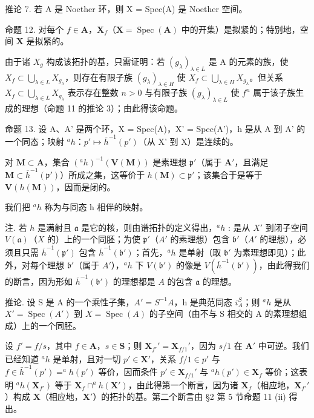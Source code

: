 推论 7. 若 A 是 Noether 环，则 X = Spec(A) 是 Noether 空间。

命题 12. 对每个 \(f \in \mathbf{A}\)，\(\mathbf{X}_f\)（\(\mathbf{X} = \operatorname{Spec}(\mathbf{A})\) 中的开集）是拟紧的；特别地，空间 \(\mathbf{X}\) 是拟紧的。

由于诸 \(X_{g}\) 构成该拓扑的基，只需证明：若 \((g_{\lambda})_{\lambda\in L}\) 是 A 的元素的族，使 \(X_{f}\subset\bigcup_{\lambda\in L}X_{g_{\lambda}}\)，则存在有限子族 \((g_{\lambda})_{\lambda\in H}\) 使 \(X_{f}\subset\bigcup_{\lambda\in H}X_{g_{\lambda}}\)。但关系 \(X_{f}\subset\bigcup_{\lambda\in L}X_{g_{\lambda}}\) 表示存在整数 \(n > 0\) 与有限子族 \((g_{\lambda})_{\lambda\in L}\) 使 \(f^{n}\) 属于该子族生成的理想（命题 11 的推论 3）；由此得该命题。

命题 13. 设 A、A' 是两个环，X = Spec(A)，X' = Spec(A')，h 是从 A 到 A' 的一个同态；映射 \(^a h\)：\(p' \mapsto \overline{h}^{-1}(p')\)（从 X' 到 X）是连续的。

对 \(\mathbf{M} \subset \mathbf{A}\)，集合 \((^a h)^{-1}(\mathbf{V}(\mathbf{M}))\) 是素理想 \(\mathfrak{p}'\)（属于 \(\mathbf{A}'\)，且满足 \(\mathbf{M} \subset \overline{h}^{-1}(\mathfrak{p}')\)）所成之集，这等价于 \(h(\mathbf{M}) \subset \mathfrak{p}'\)；该集合于是等于 \(\mathbf{V}(h(\mathbf{M}))\)，因而是闭的。

我们把 \(^{a}h\) 称为与同态 h 相伴的映射。

注. 若 \(h\) 是满射且 \(\mathfrak{a}\) 是它的核，则由谱拓扑的定义得出，\(^a h\) : 是从 \(X'\) 到闭子空间 \(V(\mathfrak{a})\)（\(X\) 的）上的一个同胚；为使 \(\mathfrak{p}'\)（\(A'\) 的素理想）包含 \(\mathfrak{b}'\)（\(A'\) 的理想），必须且只需 \(\overline{h}^{-1}(\mathfrak{p}')\) 包含 \(\overline{h}^{-1}(\mathfrak{b}')\)；首先，\(^a h\) 是单射（取 \(\mathfrak{b}'\) 为素理想即见）；此外，对每个理想 \(\mathfrak{b}'\)（属于 \(A'\)），\(^a h\) 下 \(V(\mathfrak{b}')\) 的像是 \(V(\overline{h}^{-1}(\mathfrak{b}'))\)，由此得我们的断言，因为形如 \(\overline{h}^{-1}(\mathfrak{b}')\) 的理想都是 \(A\) 的包含 \(\mathfrak{a}\) 的理想。

推论. 设 S 是 A 的一个乘性子集，\(A' = S^{-1}A\)，h 是典范同态 \(i_{A}^{S}\)；则 \(^{a}h\) 是从 \(X' = \operatorname{Spec}(A')\) 到 \(X = \operatorname{Spec}(A)\) 的子空间（由不与 S 相交的 A 的素理想组成）上的一个同胚。

设 \(f' = f / s\)，其中 \(f \in \mathbf{A}\)，\(s \in \mathbf{S}\)；则 \(\mathbf{X}_{f'}' = \mathbf{X}_{f/1}'\)，因为 \(s / 1\) 在 \(\mathbf{A}'\) 中可逆。我们已经知道 \(^a h\) 是单射，且对一切 \(p' \in \mathbf{X}'\)，关系 \(f / 1 \in p'\) 与 \(f \in \bar{h}^{-1}(p') = ^a h(p')\) 等价，因而条件 \(p' \in \mathbf{X}_{f/1}'\) 与 \(^a h(p') \in \mathbf{X}_f\) 等价；这表明 \(^a h(\mathbf{X}_{f'})\) 等于 \(\mathbf{X}_f \cap ^a h(\mathbf{X}')\)，由此得第一个断言，因为诸 \(\mathbf{X}_f\)（相应地，\(\mathbf{X}_{f'}'\)）构成 \(\mathbf{X}\)（相应地，\(\mathbf{X}'\)）的拓扑的基。第二个断言由 §2 第 5 节命题 11 (ii) 得出。


